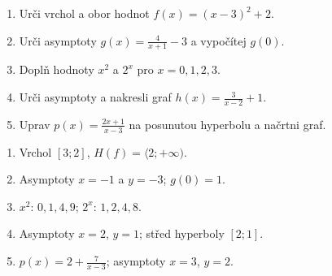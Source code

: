 \documentclass[11pt,a4paper]{article}
\begin{document}
\begin{zadaniReseniBox}[title={Domácí úkol}]
\begin{enumerate}[label=\alph*)]
\item Urči vrchol a obor hodnot $f(x)=(x-3)^2+2$.
\item Urči asymptoty $g(x)=\frac{4}{x+1}-3$ a vypočítej $g(0)$.
\item Doplň hodnoty $x^2$ a $2^x$ pro $x=0,1,2,3$.
\item Urči asymptoty a nakresli graf $h(x)=\frac{3}{x-2}+1$.
\item Uprav $p(x)=\frac{2x+1}{x-3}$ na posunutou hyperbolu a načrtni graf.
\end{enumerate}
\tcblower
\begin{enumerate}[label=\alph*)]
\item Vrchol $[3;2]$, $H(f)=\langle2;+\infty)$.
\item Asymptoty $x=-1$ a $y=-3$; $g(0)=1$.
\item $x^2$: $0,1,4,9$; $2^x$: $1,2,4,8$.
\item Asymptoty $x=2$, $y=1$; střed hyperboly $[2;1]$.
\item $p(x)=2+\frac7{x-3}$; asymptoty $x=3$, $y=2$.
\end{enumerate}
\end{zadaniReseniBox}
\end{document}
